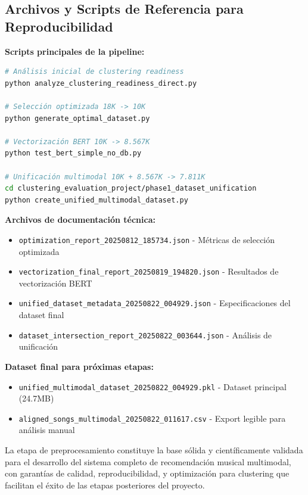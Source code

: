\documentclass[12pt,a4paper]{report}
\begin{document}
\subsection{Archivos y Scripts de Referencia para Reproducibilidad}

\textbf{Scripts principales de la pipeline:}
\begin{lstlisting}[language=bash]
# Análisis inicial de clustering readiness
python analyze_clustering_readiness_direct.py

# Selección optimizada 18K -> 10K
python generate_optimal_dataset.py

# Vectorización BERT 10K -> 8.567K
python test_bert_simple_no_db.py

# Unificación multimodal 10K + 8.567K -> 7.811K
cd clustering_evaluation_project/phase1_dataset_unification
python create_unified_multimodal_dataset.py
\end{lstlisting}

\textbf{Archivos de documentación técnica:}
\begin{itemize}[leftmargin=*]
    \item \texttt{optimization\_report\_20250812\_185734.json} - Métricas de selección optimizada
    \item \texttt{vectorization\_final\_report\_20250819\_194820.json} - Resultados de vectorización BERT
    \item \texttt{unified\_dataset\_metadata\_20250822\_004929.json} - Especificaciones del dataset final
    \item \texttt{dataset\_intersection\_report\_20250822\_003644.json} - Análisis de unificación
\end{itemize}

\textbf{Dataset final para próximas etapas:}
\begin{itemize}[leftmargin=*]
    \item \texttt{unified\_multimodal\_dataset\_20250822\_004929.pkl} - Dataset principal (24.7MB)
    \item \texttt{aligned\_songs\_multimodal\_20250822\_011617.csv} - Export legible para análisis manual
\end{itemize}

La etapa de preprocesamiento constituye la base sólida y científicamente validada para el desarrollo del sistema completo de recomendación musical multimodal, con garantías de calidad, reproducibilidad, y optimización para clustering que facilitan el éxito de las etapas posteriores del proyecto.

\end{document}
